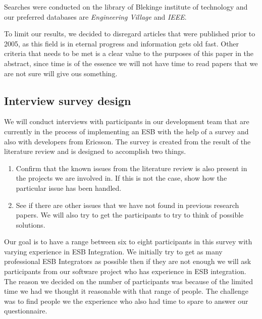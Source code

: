 \documentclass{llncs}
\begin{document}
Searches were conducted on the library of Blekinge institute of technology and our preferred databases are \emph{Engineering Village} and \emph{IEEE}.

To limit our results, we decided to disregard articles that were published prior to 2005, as this field is in eternal progress and information gets old fast.
Other criteria that needs to be met is a clear value to the purposes of this paper in the abstract, since time is of the essence we will not have time to read papers that we are not sure will give ous something.

\subsection{Interview survey design}

We will conduct interviews with participants in our development team that are currently in the process of implementing an ESB with the help of a survey and also with developers from Ericsson. The survey is created from the result of the literature review and is designed to accomplish two things.
\begin{enumerate}
\item Confirm that the known issues from the literature review is also present in the projects we are involved in. If this is not the case, show how the particular issue has been handled.
\item See if there are other issues that we have not found in previous research papers. We will also try to get the participants to try to think of possible solutions.
\end{enumerate}
Our goal is to have a range between six to eight participants in this survey with varying experience in ESB Integration. We initially try to get as many professional ESB Integrators as possible then if they are not enough we will ask participants from our software project who has experience in ESB integration. The reason we decided on the number of participants was because of the limited time we had we thought it reasonable with that range of people. The challenge was to find people we the experience who also had time to spare to answer our questionnaire. 
\end{document}
